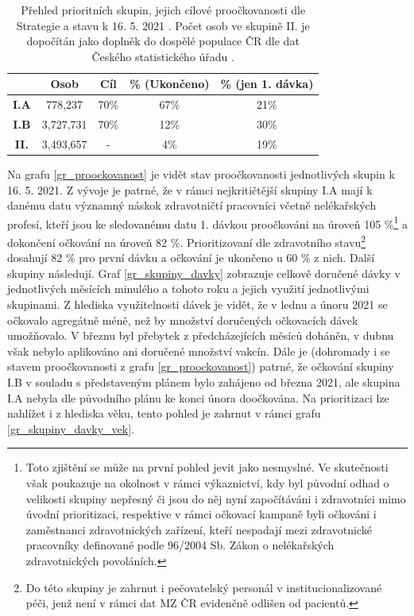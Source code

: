 \begin{table}
\begin{minipage}{\textwidth} 
\begin{centering}
\begin{tabular}{|c|c|c|c|c|}
\hline
& \textbf{Osob} & \textbf{Cíl} & \textbf{\% (Ukončeno)} & \textbf{\% (jen 1. dávka)}  \\
\hline
\textbf{I.A} & 778,237 & 70\% & 67\% & 21\% \\
\hline
\textbf{I.B} & 3,727,731 & 70\% & 12\% & 30\%\\
\hline
\textbf{II.} & 3,493,657 & - & 4\% & 19\% \\
\hline
\end{tabular}
	\caption{Přehled prioritních skupin, jejich cílové proočkovanosti dle Strategie a stavu k 16. 5. 2021 \cite{strategie_covid}. Počet osob ve skupině II. je dopočítán jako doplněk do dospělé populace ČR dle dat Českého statistického úřadu \cite{obyvatele_pocet}.}
    \label{tab_skupiny}
    
    \end{centering}
\end{minipage}
\end{table}


Na grafu \ref{gr_proockovanost} je vidět stav proočkovanosti jednotlivých skupin k 16. 5. 2021. Z vývoje je patrné, že v rámci nejkritičtější skupiny I.A mají k danému datu významný náskok zdravotničtí pracovníci včetně nelékařských profesí, kteří jsou ke sledovanému datu 1. dávkou proočkováni na úroveň 105 \%\footnote{Toto zjištění se může na první pohled jevit jako nesmyslné. Ve skutečnosti však poukazuje na okolnost v rámci výkaznictví, kdy byl původní odhad o velikosti skupiny nepřesný či jsou do něj nyní započítáváni i zdravotníci mimo úvodní prioritizaci, respektive v rámci očkovací kampaně byli očkováni i zaměstnanci zdravotnických zařízení, kteří nespadají mezi zdravotnické pracovníky definované podle 96/2004 Sb. Zákon o nelékařských zdravotnických povoláních.} a dokončení očkování na úroveň 82 \%. Prioritizovaní dle zdravotního stavu\footnote{Do této skupiny je zahrnut i pečovatelský personál v institucionalizované péči, jenž není v rámci dat MZ ČR evidenčně odlišen od pacientů.} dosahují 82 \% pro první dávku a očkování je ukončeno u 60 \% z nich. Další skupiny následují. 
%
Graf \ref{gr_skupiny_davky} zobrazuje celkově doručené dávky v jednotlivých měsících minulého a tohoto roku a jejich využití jednotlivými skupinami. Z hlediska využitelnosti dávek je vidět, že v lednu a únoru 2021 se očkovalo agregátně méně, než by množství doručených očkovacích dávek umožňovalo. V březnu byl přebytek z předcházejících měsíců doháněn, v dubnu však nebylo aplikováno ani doručené množství vakcín. Dále je (dohromady i se stavem proočkovanosti z grafu \ref{gr_proockovanost}) patrné, že očkování skupiny I.B v souladu s představeným plánem bylo zahájeno od března 2021, ale skupina I.A nebyla dle původního plánu ke konci února doočkována.
%
Na prioritizaci lze nahlížet i z hlediska věku, tento pohled je zahrnut v rámci grafu \ref{gr_skupiny_davky_vek}.


